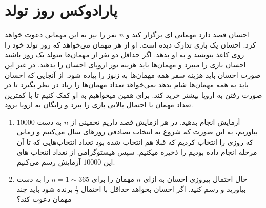 \documentclass[a4paper]{article}
\begin{document}
\section{پارادوکس روز تولد}
احسان قصد دارد مهمانی ای برگزار کند و $n$ نفر را نیز به این مهمانی دعوت خواهد کرد. احسان یک بازی تدارک دیده است. او از هر مهمان می‌خواهد که روز تولد خود را روی کاغذ بنویسد و به او بدهد. اگر حداقل دو نفر از مهمان‌ها متولد یک روز باشند احسان بازی را میبرد و مهمان‌ها باید هزینه تور اروپای احسان را بدهند. در غیر این صورت احسان باید هزینه سفر همه مهمان‌ها به زنوز را پیاده شود. از آنجایی که احسان باید به همه مهمان‌ها شام بدهد نمی‌خواهد تعداد مهمان‌ها را زیاد در نظر بگیرد تا در صورت رفتن به اروپا بیشتر خرید کند. برای همین میخواهیم به او کمک کنیم تا با کمترین تعداد مهمان با احتمال بالایی بازی را ببرد و رایگان به اروپا برود.
\begin{enumerate}
	\item
	$ 10000 $ آزمایش انجام بدهید. در هر ازمایش قصد داریم تخمینی از $n$ به دست بیاوریم، به این صورت که شروع به انتخاب تصادفی روزهای سال می‌کنیم و زمانی که روزی را انتخاب کردیم که قبلا هم انتخاب شده بود تعداد انتخاب‌هایی که تا آن مرحله انجام داده بودیم را ذخیره میکنیم. سپس هیستوگرامی از تعداد انتخاب های این $ 10000 $ آزمایش رسم می‌کنیم.
	\item
	حال احتمال پیروزی احسان به ازای $n$ مهمان را برای 
	$ n = 1 \sim 365 $
	را به دست بیاورید و رسم کنید. اگر احسان بخواهد حداقل با احتمال
	$\frac{1}{2}$
	برنده شود باید چند مهمان دعوت کند؟
\end{enumerate}
\end{document}
